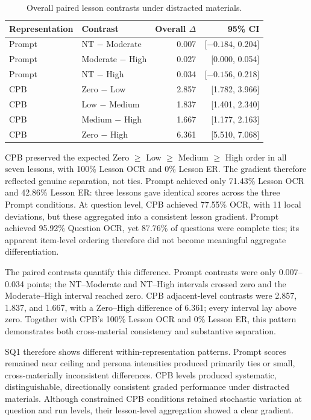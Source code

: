 \begin{table}[H]
\centering
\caption{Overall paired lesson contrasts under distracted materials.}
\label{tab:rq2-paired-contrasts}
\small
\begin{tabular}{llrr}
\toprule
\textbf{Representation} & \textbf{Contrast} & \textbf{Overall $\Delta$} & \textbf{95\% CI} \\
\midrule
Prompt & NT $-$ Moderate & 0.007 & [$-0.184$, 0.204] \\
Prompt & Moderate $-$ High & 0.027 & [0.000, 0.054] \\
Prompt & NT $-$ High & 0.034 & [$-0.156$, 0.218] \\
CPB & Zero $-$ Low & 2.857 & [1.782, 3.966] \\
CPB & Low $-$ Medium & 1.837 & [1.401, 2.340] \\
CPB & Medium $-$ High & 1.667 & [1.177, 2.163] \\
CPB & Zero $-$ High & 6.361 & [5.510, 7.068] \\
\bottomrule
\end{tabular}
\end{table}

CPB preserved the expected Zero $\geq$ Low $\geq$ Medium $\geq$ High order in all seven lessons, with 100\% Lesson OCR and 0\% Lesson ER. The gradient therefore reflected genuine separation, not ties. Prompt achieved only 71.43\% Lesson OCR and 42.86\% Lesson ER: three lessons gave identical scores across the three Prompt conditions. At question level, CPB achieved 77.55\% OCR, with 11 local deviations, but these aggregated into a consistent lesson gradient. Prompt achieved 95.92\% Question OCR, yet 87.76\% of questions were complete ties; its apparent item-level ordering therefore did not become meaningful aggregate differentiation.

The paired contrasts quantify this difference. Prompt contrasts were only 0.007--0.034 points; the NT--Moderate and NT--High intervals crossed zero and the Moderate--High interval reached zero. CPB adjacent-level contrasts were 2.857, 1.837, and 1.667, with a Zero--High difference of 6.361; every interval lay above zero. Together with CPB's 100\% Lesson OCR and 0\% Lesson ER, this pattern demonstrates both cross-material consistency and substantive separation.

SQ1 therefore shows different within-representation patterns. Prompt scores remained near ceiling and persona intensities produced primarily ties or small, cross-materially inconsistent differences. CPB levels produced systematic, distinguishable, directionally consistent graded performance under distracted materials. Although constrained CPB conditions retained stochastic variation at question and run levels, their lesson-level aggregation showed a clear gradient.

